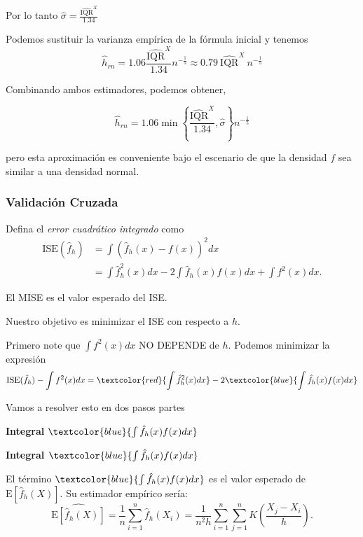 \documentclass[
  12pt,
]{book}
\begin{document}
Por lo tanto
\(\displaystyle \hat{\sigma} = \frac{\widehat{\mathrm{IQR}}^{X}}{1.34}\)

Podemos sustituir la varianza empírica de la fórmula inicial y tenemos
\begin{equation*}
\hat{h}_{rn} = 1.06 \frac{\widehat{\mathrm{IQR}}^{X}}{1.34} n^{-\frac{1}{5}} \approx 0.79\  \widehat{\mathrm{IQR}}^{X}\ n^{-\frac{1}{5}}
\end{equation*}

Combinando ambos estimadores, podemos obtener,

\begin{equation*}
\hat{h}_{rn} = 1.06 \min \left\{\frac{\widehat{\mathrm{IQR}}^{X}}{1.34}, \hat{\sigma }\right\} n^{-\frac{1}{5}}
\end{equation*}

pero esta aproximación es conveniente bajo el escenario de que la
densidad \(f\) sea similar a una densidad normal.

\hypertarget{validaciuxf3n-cruzada}{%
\subsubsection{Validación Cruzada}\label{validaciuxf3n-cruzada}}

Defina el \emph{error cuadrático integrado} como \begin{align*}
\mathrm{ISE}(\hat{f}_{h}) & =\int\left(\hat{f}_{h}(x)-f(x)\right)^{2}dx\nonumber                   \\
& =\int \hat{f}_{h}^{2}(x)dx-2\int \hat{f}_{h}(x)f(x)dx+\int f^{2}(x)dx.
\end{align*}

El MISE es el valor esperado del ISE.

Nuestro objetivo es minimizar el ISE con respecto a \(h\).

Primero note que \(\int f^{2}(x)dx\) NO DEPENDE de \(h\). Podemos
minimizar la expresión \begin{equation*}
\mathrm{ISE}(\hat{f}_{h})-\int f^{2}(x)dx=
\textcolor{red}{\int\hat{f}_{h}^{2}(x)dx}
-2
\textcolor{blue}{\int\hat{f}_{h}(x)f(x)dx}
\end{equation*}

Vamos a resolver esto en dos pasos partes

\textbf{Integral} \(\textcolor{blue}{\int\hat{f}_{h}(x)f(x)dx}\)

\textbf{Integral \(\textcolor{blue}{\int\hat{f}_{h}(x)f(x)dx}\)}

El término \(\textcolor{blue}{\int\hat{f}_{h}(x)f(x)dx}\) es el valor
esperado de \(\mathrm{E}\left[\hat{f}_h(X)\right]\). Su estimador
empírico sería: \begin{equation*}
\widehat{\mathrm{E}\left[\hat{f}_h(X)\right]}
= \frac{1}{n}\sum_{i=1}^{n}\hat{f}_{h}(X_{i})
=\frac{1}{n^{2}h}\sum_{i=1}^{n}\sum_{j=1}^{n}
K\left(\frac{X_{j}-X_{i}}{h}\right).
\end{equation*}
\end{document}
